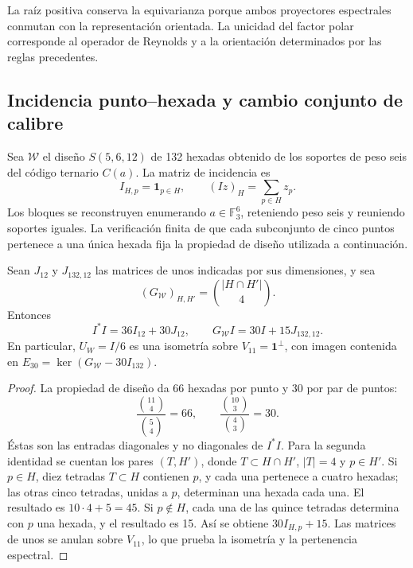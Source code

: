 La raíz positiva conserva la equivarianza porque ambos proyectores
espectrales conmutan con la representación orientada. La unicidad del
factor polar corresponde al operador de Reynolds y a la orientación
determinados por las reglas precedentes.

\subsection{Incidencia punto--hexada y cambio conjunto de calibre}

Sea \(\mathcal W\) el diseño \(S(5,6,12)\) de 132 hexadas obtenido
de los soportes de peso seis del código ternario \(C(a)\). La matriz
de incidencia es
\[
 I_{H,p}=\mathbf1_{p\in H},\qquad
 (Iz)_H=\sum_{p\in H}z_p.
\]
Los bloques se reconstruyen enumerando \(a\in\mathbb F_3^6\),
reteniendo peso seis y reuniendo soportes iguales. La verificación
finita de que cada subconjunto de cinco puntos pertenece a una única
hexada fija la propiedad de diseño utilizada a continuación.

\begin{lemma}
\label{ii:lem:ii-witt-incidence-identities}
Sean \(J_{12}\) y \(J_{132,12}\) las matrices de unos indicadas por
sus dimensiones, y sea
\[
 (G_{\mathcal W})_{H,H'}=\binom{|H\cap H'|}{4}.
\]
Entonces
\begin{equation}
 I^*I=36I_{12}+30J_{12},\qquad
 G_{\mathcal W}I=30I+15J_{132,12}.
 \label{ii:eq:ii-witt-incidence-identities}
\end{equation}
En particular, \(U_W=I/6\) es una isometría sobre
\(V_{11}=\mathbf1^\perp\), con imagen contenida en
\(E_{30}=\ker(G_{\mathcal W}-30I_{132})\).
\end{lemma}
\begin{proof}
La propiedad de diseño da 66 hexadas por punto y 30 por par de puntos:
\[
 \frac{\binom{11}{4}}{\binom54}=66,
 \qquad \frac{\binom{10}{3}}{\binom43}=30.
\]
Éstas son las entradas diagonales y no diagonales de \(I^*I\).
Para la segunda identidad se cuentan los pares \((T,H')\), donde
\(T\subset H\cap H'\), \(|T|=4\) y \(p\in H'\).
Si \(p\in H\), diez tetradas \(T\subset H\) contienen \(p\),
y cada una pertenece a cuatro hexadas; las otras cinco tetradas,
unidas a \(p\), determinan una hexada cada una. El resultado es
\(10\cdot4+5=45\). Si \(p\notin H\), cada una de las quince
tetradas determina con \(p\) una hexada, y el resultado es 15.
Así se obtiene \(30I_{H,p}+15\). Las matrices de unos se anulan sobre
\(V_{11}\), lo que prueba la isometría y la pertenencia espectral.
\end{proof}

